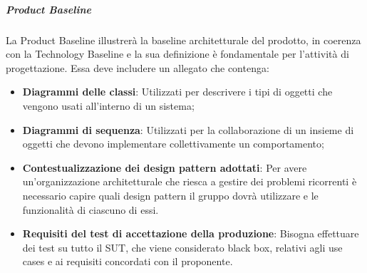 \subparagraph{Product Baseline}
La Product Baseline illustrerà la baseline architetturale del prodotto, in coerenza con la Technology Baseline e la sua definizione è fondamentale per l'attività di progettazione.
Essa deve includere un allegato che contenga:
\begin{itemize}
	\item \textbf{Diagrammi delle classi}: Utilizzati per descrivere i tipi di oggetti che vengono usati all'interno di un sistema;
	\item \textbf{Diagrammi di sequenza}: Utilizzati per la collaborazione di un insieme di oggetti che devono implementare collettivamente un comportamento;
	\item \textbf{Contestualizzazione dei design pattern adottati}: Per avere un'organizzazione architetturale che riesca a gestire dei problemi ricorrenti è necessario capire quali design pattern il gruppo dovrà utilizzare e le funzionalità di ciascuno di essi.	
	\item \textbf{Requisiti del test di accettazione della produzione}: Bisogna effettuare dei test su tutto il SUT, che viene considerato black box, relativi agli use cases e ai requisiti concordati con il proponente.
\end{itemize}